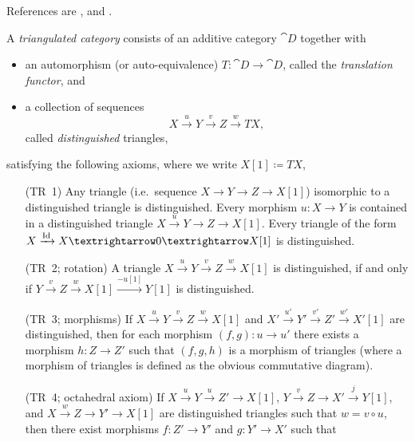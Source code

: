 \documentclass[english]{short-notes}
\begin{document}
References are \cite{Verdier:1977:CategoriesDerivees}, \cite[Chapter IV]{GelfandManin:2003:MethodsOfHomologicalAlgebra} and \cite[Section 1.1]{BeilinsonBernsteinDeligne:1982:FaisceauxPervers}.

\begin{Def}
    A \emph{triangulated category} consists of an additive category $\cat D$ together with
    \begin{itemize}
        \item an automorphism (or auto-equivalence) $T\colon \cat D → \cat D$, called the \emph{translation functor}, and
        \item a collection of sequences
            \[ X \xrightarrow{u} Y \xrightarrow{v} Z \xrightarrow{w} TX, \]
            called \emph{distinguished} triangles,
    \end{itemize}
    satisfying the following axioms, where we write $X[1] \coloneq TX$,
        \begin{enumerate}
            \item[(TR~1)]
                Any triangle (i.e.\ sequence $X → Y → Z → X[1]$) isomorphic to a distinguished triangle is distinguished.
                Every morphism $u\colon X → Y$ is contained in a distinguished triangle $X \xrightarrow{u} Y → Z → X[1]$.
                Every triangle of the form $X \xrightarrow{\id} X → 0 → X[1]$ is distinguished.
            \item[(TR~2; rotation)]
                A triangle $X \xrightarrow{u} Y \xrightarrow{v} Z \xrightarrow{w} X[1]$ is distinguished, if and only if $Y \xrightarrow{v} Z \xrightarrow{w} X[1] \xrightarrow{-u[1]} Y[1]$ is distinguished.
            \item[(TR~3; morphisms)] 
                If $X \xrightarrow{u} Y \xrightarrow{v} Z \xrightarrow{w} X[1]$ and
                $X' \xrightarrow{u'} Y' \xrightarrow{v'} Z' \xrightarrow{w'} X'[1]$
                are distinguished, then for each morphism $(f,g)\colon u → u'$ there exists a morphism $h\colon Z → Z'$ such that $(f,g,h)$ is a morphism of triangles (where a morphism of triangles is defined as the obvious commutative diagram).
            \item[(TR~4; octahedral axiom)]
                If $X \xrightarrow{u} Y \xrightarrow{u} Z' → X[1]$,
                $Y \xrightarrow{v} Z \xrightarrow{} X' \xrightarrow{j} Y[1]$, and
                $X \xrightarrow{w} Z \xrightarrow{} Y' \xrightarrow{} X[1]$
                are distinguished triangles such that $w = v∘u$, then there exist morphisms $f\colon Z' → Y'$ and $g\colon Y' → X'$ such that

\end{enumerate}
\end{Def}
\end{document}
